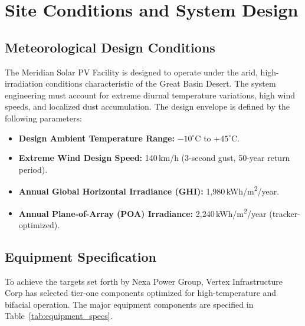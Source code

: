 \section{Site Conditions and System Design}
\label{sec:site_design}

\subsection{Meteorological Design Conditions}
The Meridian Solar PV Facility is designed to operate under the arid, high-irradiation conditions characteristic of the Great Basin Desert. The system engineering must account for extreme diurnal temperature variations, high wind speeds, and localized dust accumulation. The design envelope is defined by the following parameters:
\begin{itemize}
    \item \textbf{Design Ambient Temperature Range:} $-10^\circ$C to $+45^\circ$C.
    \item \textbf{Extreme Wind Design Speed:} 140\,km/h (3-second gust, 50-year return period).
    \item \textbf{Annual Global Horizontal Irradiance (GHI):} 1,980\,kWh/m\textsuperscript{2}/year.
    \item \textbf{Annual Plane-of-Array (POA) Irradiance:} 2,240\,kWh/m\textsuperscript{2}/year (tracker-optimized).
\end{itemize}

\subsection{Equipment Specification}
To achieve the targets set forth by Nexa Power Group, Vertex Infrastructure Corp has selected tier-one components optimized for high-temperature and bifacial operation. The major equipment components are specified in Table~\ref{tab:equipment_specs}.

